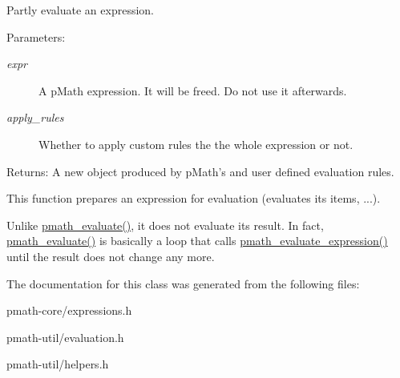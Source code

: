 Partly evaluate an expression. 

\begin{Desc}
\item[Parameters:]
\begin{description}
\item[{\em expr}]A pMath expression. It will be freed. Do not use it afterwards. \item[{\em apply\_\-rules}]Whether to apply custom rules the the whole expression or not. \end{description}
\end{Desc}
\begin{Desc}
\item[Returns:]A new object produced by pMath's and user defined evaluation rules.\end{Desc}
This function prepares an expression for evaluation (evaluates its items, ...). \par
 Unlike \hyperlink{classpmath__t_d95c86ef0de178de4d3560518c8a8157}{pmath\_\-evaluate()}, it does not evaluate its result. In fact, \hyperlink{classpmath__t_d95c86ef0de178de4d3560518c8a8157}{pmath\_\-evaluate()} is basically a loop that calls \hyperlink{classpmath__expr__t_d723e196e3d7f9078729bc0fb2fe7eed}{pmath\_\-evaluate\_\-expression()} until the result does not change any more. 

The documentation for this class was generated from the following files:\begin{CompactItemize}
\item 
pmath-core/expressions.h\item 
pmath-util/evaluation.h\item 
pmath-util/helpers.h\end{CompactItemize}
